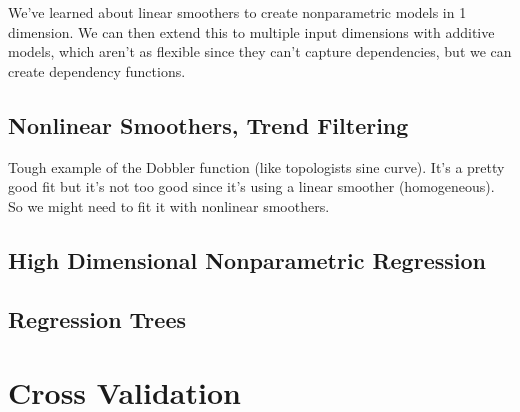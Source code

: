 \documentclass{article}
\begin{document}
    We've learned about linear smoothers to create nonparametric models in 1 dimension. We can then extend this to multiple input dimensions with additive models, which aren't as flexible since they can't capture dependencies, but we can create dependency functions. 

  \subsection{Nonlinear Smoothers, Trend Filtering} 

    Tough example of the Dobbler function (like topologists sine curve). It's a pretty good fit but it's not too good since it's using a linear smoother (homogeneous). So we might need to fit it with nonlinear smoothers. 

  \subsection{High Dimensional Nonparametric Regression}

  \subsection{Regression Trees}

\section{Cross Validation} 
\end{document}
